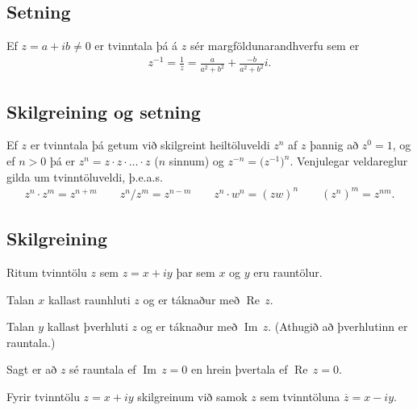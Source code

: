 \documentclass[a4paper,10pt,icelandic]{sphinxmanual}
\begin{document}
\subsection{Setning}
\label{\detokenize{Kafli01:id2}}
Ef \(z=a+ib\neq 0\) er tvinntala þá á \(z\) sér
margföldunarandhverfu sem er
\begin{equation*}
\begin{split}z^{-1}=\frac{1}{z}=\frac{a}{a^2+b^2}+\frac{-b}{a^2+b^2}i.\end{split}
\end{equation*}

\subsection{Skilgreining og setning}
\label{\detokenize{Kafli01:skilgreining-og-setning}}
Ef \(z\) er tvinntala þá getum við
skilgreint heiltöluveldi \(z^n\) af \(z\) þannig að
\(z^0=1\), og ef \(n>0\) þá er
\(z^n=z\cdot z\cdot\ldots\cdot z\) (\(n\) sinnum) og
\(z^{-n}=\big(z^{-1}\big)^n\). Venjulegar veldareglur gilda um
tvinntöluveldi, þ.e.a.s.
\begin{equation*}
\begin{split}z^n\cdot z^m=z^{n+m}\qquad z^n/z^m=z^{n-m}\qquad z^n\cdot w^n=(zw)^{n}
\qquad (z^n)^m=z^{nm}.\end{split}
\end{equation*}

\subsection{Skilgreining}
\label{\detokenize{Kafli01:id3}}
Ritum tvinntölu \(z\) sem \(z=x+iy\) þar sem
\(x\) og \(y\) eru rauntölur.

Talan \(x\) kallast raunhluti \(z\) og er táknaður með
\(\operatorname{Re\, } z\).

Talan \(y\) kallast þverhluti \(z\) og er táknaður með
\(\operatorname{Im\, } z\). (Athugið að þverhlutinn er rauntala.)

Sagt er að \(z\) sé rauntala ef \(\operatorname{Im\, } z=0\) en hrein þvertala ef
\(\operatorname{Re\, } z=0\).

Fyrir tvinntölu \(z=x+iy\) skilgreinum við samok \(z\) sem
tvinntöluna \(\overline{z}=x-iy\).
\end{document}
